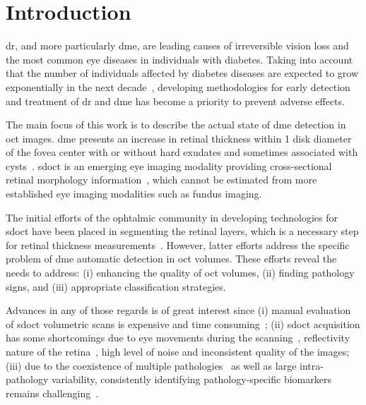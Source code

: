 \graphicspath{ {./content/intro/figures/} }

\section{Introduction}
\label{sec:intro}  %

\gls{dr}, and more particularly \gls{dme}, are leading causes of irreversible vision loss and the most common eye diseases in individuals with diabetes.
Taking into account that the number of individuals affected by diabetes diseases are expected to grow exponentially in the next decade~\cite{wild2004global},
developing methodologies for early detection and treatment of \gls{dr} and \gls{dme} has become a priority to prevent adverse effects.

The main focus of this work is to describe the actual state of \gls{dme} detection in \gls{oct} images.
\gls{dme} presents an increase in retinal thickness within 1 disk diameter of the fovea center with or without hard exudates and sometimes associated with cysts~\cite{ETDRSG1985}.
\gls{sdoct} is an emerging eye imaging modality providing cross-sectional retinal morphology information~\cite{Wang2015}, which cannot be estimated from more established eye imaging modalities such as fundus imaging.

The initial efforts of the ophtalmic community in developing technologies for \gls{sdoct} have been placed in segmenting the retinal layers, which is a necessary step for retinal thickness measurements~\cite{Chiu2010,Kafieh2013}.
However, latter efforts address the specific problem of \gls{dme} automatic detection in \gls{oct} volumes.
These efforts reveal the needs to address: (i) enhancing the quality of \gls{oct} volumes,
(ii) finding pathology signs,
and (iii) appropriate classification strategies.

Advances in any of those regards is of great interest since (i) manual evaluation of \gls{sdoct} volumetric scans is expensive and time consuming~\cite{Venhuizen2015};
(ii) \gls{sdoct} acquisition has some shortcomings due to eye movements during the scanning~\cite{Liu2011}, reflectivity nature of the retina~\cite{schuman2004optical}, high level of noise and inconsistent quality of the images;
(iii) due to the coexistence of multiple pathologies~\cite{Liu2011} as well as large intra-pathology variability, consistently identifying pathology-specific biomarkers remains challenging~\cite{Venhuizen2015}.

